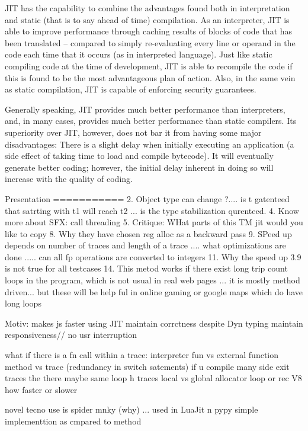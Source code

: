 JIT has the capability to combine the advantages found both in interpretation
and static (that is to say ahead of time) compilation. As an interpreter, JIT
is able to improve performance through caching results of blocks of code that
has been translated – compared to simply re-evaluating every line or operand in
the code each time that it occurs (as in interpreted language). Just like
static compiling code at the time of development, JIT is able to recompile the
code if this is found to be the most advantageous plan of action. Also, in the
same vein as static compilation, JIT is capable of enforcing security
guarantees.

Generally speaking, JIT provides much better performance than interpreters,
          and, in many cases, provides much better performance than static
          compilers. Its superiority over JIT, however, does not bar it from
          having some major disadvantages: There is a slight delay when
          initially executing an application (a side effect of taking time to
              load and compile bytecode). It will eventually generate better
          coding; however, the initial delay inherent in doing so will increase
          with the quality of coding.


Presentation
===========
2. Object type can change ?.... is t gatenteed that satrting with t1 will reach t2 ... is the type stabilization qurenteed.
4. Know more about SFX: call threading
5. Critique: WHat parts of this TM jit would you like to copy
8. Why they have chosen reg alloc as a backward pass
9. SPeed up depends on number of traces and length of a trace .... what optimizations are done ..... can all fp operations are converted to 
integers
11. Why the speed up 3.9 is not true for all testcases
14. This metod works if there exist long trip count loops in the program, which is not
usual in real web pages ... it is mostly method driven... but these will be help ful in
online gaming or google maps which do have long loops

Motiv:
makes js faster using JIT
maintain corrctness despite Dyn typing
maintain responsiveness// no usr interruption

what if there is a fn call within a trace: interpreter fun vs external function
method vs trace (redundancy in switch satements)
if u compile many side exit traces the there maybe same loop h traces
local vs global allocator
loop or rec
V8 how faster or slower

novel tecno use is spider mnky (why) ... used in LuaJit n pypy
simple implementtion as cmpared to method

